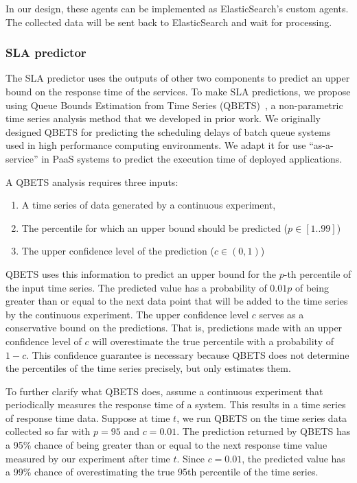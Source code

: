 In our design, these agents can be implemented as ElasticSearch's custom agents. The collected data will be sent back to ElasticSearch
and wait for processing.

\subsubsection{SLA predictor}
The SLA predictor uses the outputs of other two components to predict an upper bound 
on the response time of the services.
To make SLA predictions, we propose using Queue Bounds Estimation from Time Series 
(QBETS)~\cite{Nurmi:2007:QQB:1791551.1791556}, 
a non-parametric time series analysis method that we developed in prior work. 
We originally designed QBETS for
predicting the scheduling delays of batch queue systems 
used in high performance computing environments. 
We adapt it for use ``as-a-service'' in PaaS systems 
to predict the execution time of deployed applications.

A QBETS analysis requires three inputs:
\begin{enumerate}
\item A time series of data generated by a continuous experiment,
\item The percentile for which an upper bound should be predicted ($p \in [1..99]$)
\item The upper confidence level of the prediction ($c \in (0,1)$)
\end{enumerate}

QBETS uses this information to predict an upper bound for 
the $p$-th percentile of the input time series.
The predicted value has a probability of $0.01p$ of 
being greater than or equal to the next data point that
will be added to the time series by the continuous experiment. 
The upper confidence level $c$ serves as a conservative
bound on the predictions. That is, predictions made with an upper confidence 
level of $c$ will overestimate
the true percentile with a probability of $1-c$. This confidence guarantee 
is necessary because 
QBETS does not determine the 
percentiles of the time series precisely, but only estimates them.

To further clarify what QBETS does, assume a continuous experiment 
that periodically measures the
response time of a system. This results in a time series of 
response time data. Suppose at time $t$,
we run QBETS on the time series data collected so far 
with $p=95$ and $c=0.01$. The prediction returned
by QBETS has a 95\% chance of being greater than or equal 
to the next response time value measured
by our experiment after time $t$. Since $c=0.01$, the predicted value has a 99\% chance of
overestimating the true 95th percentile of the time series.

